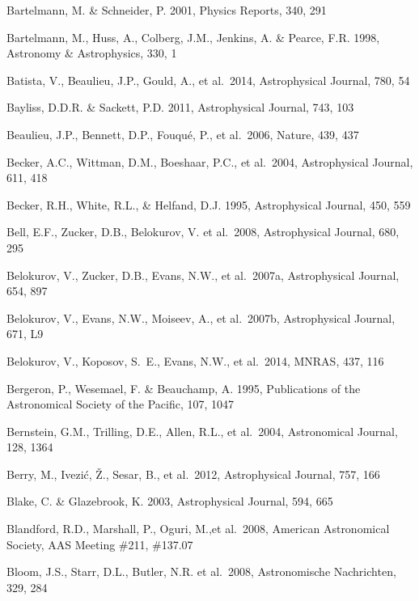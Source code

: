\documentclass{emulateapj}
\begin{document}
\begin{thebibliography}{}
\bibitem[()]{} Bartelmann, M. \& Schneider, P. 2001, Physics Reports, 340, 291
	
\bibitem[()]{} Bartelmann, M., Huss, A., Colberg, J.M., Jenkins, A. \& Pearce, F.R. 1998, Astronomy \& 
             Astrophysics, 330, 1

\bibitem[()]{} Batista, V., Beaulieu, J.P., Gould, A., et al.~2014, Astrophysical Journal, 780, 54 

\bibitem[()]{} Bayliss, D.D.R. \& Sackett, P.D. 2011, Astrophysical Journal, 743, 103	

\bibitem[()]{} Beaulieu, J.P., Bennett, D.P., Fouqu\'{e}, P., et al.~2006, Nature, 439, 437

\bibitem[()]{} Becker, A.C., Wittman, D.M., Boeshaar, P.C., et al.~2004, Astrophysical Journal, 611, 418

\bibitem[()]{} Becker, R.H., White, R.L., \& Helfand, D.J. 1995, Astrophysical Journal, 450, 559

\bibitem[()]{} Bell, E.F., Zucker, D.B., Belokurov, V. et al.~2008, Astrophysical Journal, 680, 295
	
\bibitem[()]{} Belokurov, V., Zucker, D.B., Evans, N.W., et al.~2007a, Astrophysical Journal, 654, 897

\bibitem[()]{} Belokurov, V., Evans, N.W., Moiseev, A., et al.~2007b, Astrophysical Journal, 671, L9

\bibitem[()]{} Belokurov, V., Koposov, S.~E., Evans, N.W., et al.~2014, MNRAS, 437, 116

\bibitem[()]{} Bergeron, P., Wesemael, F. \& Beauchamp, A. 1995, Publications of the Astronomical Society
                   of the Pacific, 107, 1047

\bibitem[()]{} Bernstein, G.M., Trilling, D.E., Allen, R.L., et al.~2004, Astronomical Journal, 128, 1364

\bibitem[()]{} Berry, M., Ivezi\'c, \v Z., Sesar, B., et al.~2012, Astrophysical Journal, 757, 166

\bibitem[()]{} Blake, C. \& Glazebrook, K. 2003, Astrophysical Journal, 594, 665

\bibitem[()]{} Blandford, R.D., Marshall, P., Oguri, M.,et al.~2008, 
                           American Astronomical Society, AAS Meeting \#211, \#137.07
	
\bibitem[()]{} Bloom, J.S., Starr, D.L., Butler, N.R. et al.~2008, Astronomische Nachrichten, 329, 284



\end{thebibliography}
\end{document}
